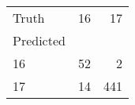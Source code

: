 \begin{tabular}{lrr}
\toprule
Truth & 16 & 17 \\
Predicted &  &  \\
\midrule
16 & 52 & 2 \\
17 & 14 & 441 \\
\bottomrule
\end{tabular}
